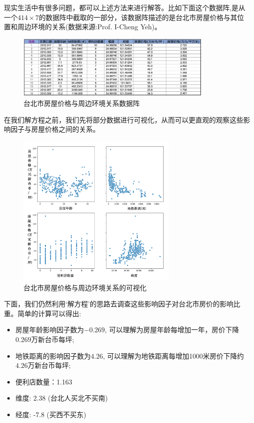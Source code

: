 \documentclass[12pt]{article}
\numberwithin{figure}{section}
\newenvironment{fullmodel}{
			\smallskip\noindent
			\begin{minipage}{\textwidth+\marginparwidth+\marginparsep}\smallskip\smallskip}
			{\smallskip\smallskip\end{minipage}\vspace{.1in}
			}
\numberwithin{equation}{section}
\begin{document}
\begin{fullmodel}
现实生活中有很多问题，都可以上述方法来进行解答。比如下面这个数据阵,是从一个$414\times7$的数据阵中截取的一部分，该数据阵描述的是台北市房屋价格与其位置和周边环境的关系(数据来源:Prof. I-Cheng Yeh)。
\begin{figure}[H]
	\centering
	\includegraphics[width=0.86\textwidth]{fig/C1C2RealEst}
	\caption{台北市房屋价格与周边环境关系数据阵}
\end{figure}

在我们解方程之前，我们先将部分数据进行可视化，从而可以更直观的观察这些影响因子与房屋价格之间的关系。
\begin{figure}[H]
	\centering
	\includegraphics[width=0.7\textwidth]{fig/C1C2TbRealEst}
	\caption{台北市房屋价格与周边环境关系的可视化}
\end{figure}
\end{fullmodel}

下面，我们仍然利用`解方程'的思路去调查这些影响因子对台北市房价的影响比重。简单的计算可以得出:
\begin{itemize}
	\item 房屋年龄影响因子数为$-0.269$, 可以理解为房屋年龄每增加一年，房价下降$0.269$万新台币每坪;
	\item 地铁距离的影响因子数为$4.26$, 可以理解为地铁距离每增加1000米房价下降约$4.26$万新台币每坪;
	\item 便利店数量：1.163
	\item 维度: 2.38 (台北人买北不买南)
	\item 经度: -7.8 (买西不买东)
\end{itemize}
\end{document}

